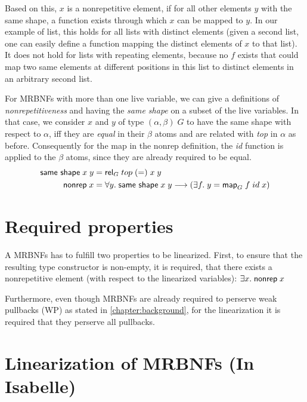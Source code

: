     Based on this, $x$ is a nonrepetitive element, if for all other elements $y$ with the same shape, a function exists through which $x$ can be mapped to $y$. In our example of \textsf{list}, this holds for all lists with distinct elements (given a second list, one can easily define a function mapping the distinct elements of $x$ to that list). It does not hold for lists with repeating elements, because no $f$ exists that could map two same elements at different positions in this list to distinct elements in an arbitrary second list.

    For \acp{MRBNF} with more than one live variable, we can give a definitions of \textit{nonrepetitiveness} and having the \textit{same shape} on a subset of the live variables. In that case, we consider $x$ and $y$ of type $(\alpha, \beta)\; G$ to have the same shape with respect to $\alpha$, iff they are \textit{equal} in their $\beta$ atoms and are related with \textit{top} in $\alpha$ as before. Consequently for the map in the \textsf{nonrep} definition, the \textit{id} function is applied to the $\beta$ atoms, since they are already required to be equal. 
    \begin{align}
      \text{\textsf{same shape}}\; x\; y &= \text{\textsf{rel}}_G\; top\; (=)\; x\; y\\
      \text{\textsf{nonrep}}\; x &= \forall y.\; \text{\textsf{same shape}}\; x\; y \longrightarrow (\exists f.\; y = \text{\textsf{map}}_G\; f\; id\; x)
    \end{align}
    
    
  \section{Required properties}
    A \acp{MRBNF} has to fulfill two properties to be linearized. First, to ensure that the resulting type constructor is non-empty, it is required, that there exists a nonrepetitive element (with respect to the linearized variables): $\exists x.\; \text{\textsf{nonrep}}\; x$

    Furthermore, even though \acp{MRBNF} are already required to perserve weak pullbacks (WP) as stated in \autoref{chapter:background}, for the linearization it is required that they perserve all pullbacks. %

    
  \section{Linearization of MRBNFs (In Isabelle)}

  